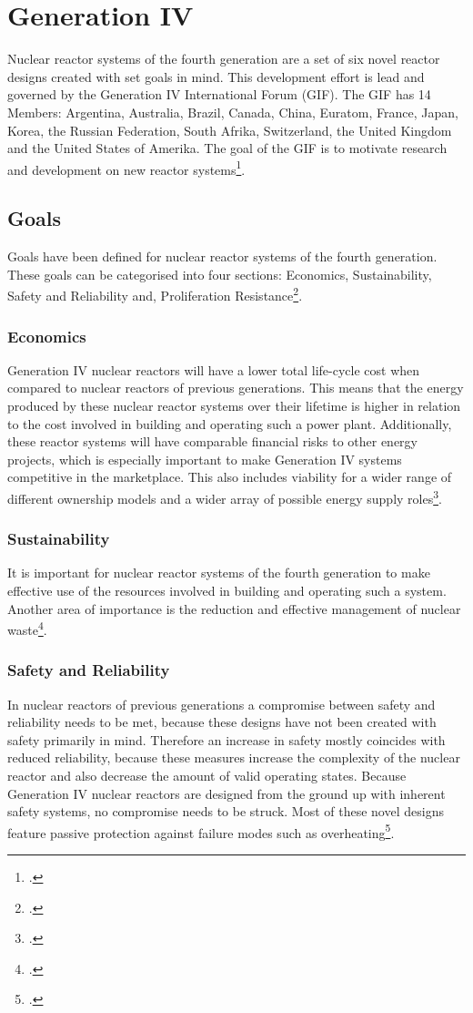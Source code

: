 \chapter{Generation IV}
Nuclear reactor systems of the fourth generation are a set of six novel reactor designs created with
set goals in mind. This development effort is lead and governed by the Generation IV International Forum
(GIF). The GIF has 14 Members: Argentina, Australia, Brazil, Canada, China, Euratom, France, Japan,
Korea, the Russian Federation, South Afrika, Switzerland, the United Kingdom and the United States of Amerika.
The goal of the GIF is to motivate research and development on new reactor systems\footcite[6]{GIFAR}.
\section{Goals}
Goals have been defined for nuclear reactor systems of the fourth generation. These goals
can be categorised into four sections: Economics, Sustainability, Safety and Reliability and, Proliferation Resistance\footcite[38]{IVHandbook}.
\subsection{Economics}
Generation IV nuclear reactors will have a lower total life-cycle cost when compared to nuclear reactors
of previous generations. This means that the energy produced by these nuclear reactor systems over
their lifetime is higher in relation to the cost involved in building and operating such a power plant.
Additionally, these reactor systems will have comparable financial risks to other energy projects, which
is especially important to make Generation IV systems competitive in the marketplace. This also includes
viability for a wider range of different ownership models and a wider array of possible energy supply roles\footcite[6]{GIFAR}.
\subsection{Sustainability}
It is important for nuclear reactor systems of the fourth generation to make effective use of the resources
involved in building and operating such a system. Another area of importance is the reduction and effective
management of nuclear waste\footcite[38]{IVHandbook}.
\subsection{Safety and Reliability}
In nuclear reactors of previous generations a compromise between safety and reliability needs to be met,
because these designs have not been created with safety primarily in mind. Therefore an increase in safety
mostly coincides with reduced reliability, because these measures increase the complexity of the nuclear reactor and
also decrease the amount of valid operating states. Because Generation IV nuclear reactors are designed from the ground up
with inherent safety systems, no compromise needs to be struck. Most of these novel designs feature passive
protection against failure modes such as overheating\footcite[6]{GIFAR}.
